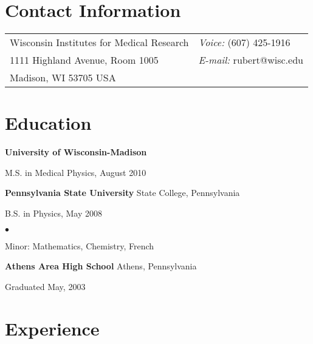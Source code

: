 \documentclass[margin,line]{res}
\newenvironment{list1}{
  \begin{list}{\ding{113}}{%
      \setlength{\itemsep}{0in}
      \setlength{\parsep}{0in} \setlength{\parskip}{0in}
      \setlength{\topsep}{0in} \setlength{\partopsep}{0in}
      \setlength{\leftmargin}{0.17in}}}{\end{list}}
\newenvironment{list2}{
  \begin{list}{$\bullet$}{%
      \setlength{\itemsep}{0in}
      \setlength{\parsep}{0in} \setlength{\parskip}{0in}
      \setlength{\topsep}{0in} \setlength{\partopsep}{0in}
      \setlength{\leftmargin}{0.2in}}}{\end{list}}
\begin{document}

\begin{resume}
\section{\sc Contact Information}
\vspace{.05in}
\begin{tabular}{@{}p{3in}p{4in}}
Wisconsin Institutes for Medical Research & {\it Voice:} (607) 425-1916 \\
1111 Highland Avenue, Room 1005 & {\it E-mail:} rubert@wisc.edu \\
Madison, WI 53705 USA \\
\end{tabular}

\section{\sc Education}
{\bf University of Wisconsin-Madison} \\
\vspace*{-.1in}
\begin{list1}
\item[] M.S. in Medical Physics, August 2010
\vspace*{.05in}

\end{list1}

{\bf Pennsylvania State University} State College, Pennsylvania\\
\vspace*{-.1in}
\begin{list1}
\item[] B.S. in Physics, May 2008

\begin{list2}
 \vspace*{.05in}
 \item Minor: Mathematics, Chemistry, French
\end{list2}
\end{list1}

{\bf Athens Area High School} Athens, Pennsylvania \\
\vspace*{-.1in}
\begin{list1}
\item[] Graduated May, 2003
\end{list1}

\section{\sc Experience}


\end{resume}
\end{document}
